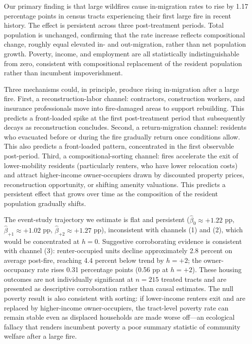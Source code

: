 \documentclass[12pt]{article}
\begin{document}
Our primary finding is that large wildfires cause in-migration rates
to rise by 1.17 percentage points in census tracts experiencing 
their first large fire in recent history. The effect is persistent across 
three post-treatment periods.
Total population is unchanged, confirming that
the rate increase reflects compositional change, roughly equal elevated
in- and out-migration, rather than net population growth.
Poverty, income, and employment are all statistically indistinguishable
from zero, consistent with compositional replacement of the resident
population rather than incumbent impoverishment.

Three mechanisms could, in principle, produce rising in-migration after
a large fire. First, a reconstruction-labor channel: contractors, construction
workers, and insurance professionals move into fire-damaged areas to
support rebuilding. This predicts a front-loaded spike at the first post-treatment period that
subsequently decays as reconstruction concludes.
Second, a return-migration channel: residents who evacuated
before or during the fire gradually return once conditions allow.
This also predicts a front-loaded pattern, concentrated in the first
observable post-period. Third, a compositional-sorting channel: fires accelerate
the exit of lower-mobility residents (particularly renters, who have lower
relocation costs) and attract higher-income owner-occupiers drawn by
discounted property prices, reconstruction opportunity, or shifting
amenity valuations. This predicts a persistent effect that grows over time as the composition
of the resident population gradually shifts.

The event-study trajectory we estimate is flat and persistent
($\hat{\beta}_0 \approx +1.22$ pp, $\hat{\beta}_{+1} \approx +1.02$ pp,
$\hat{\beta}_{+2} \approx +1.27$ pp), inconsistent with channels (1)
and (2), which would be concentrated at $h = 0$.
Suggestive corroborating evidence is consistent with channel (3):
renter-occupied units decline approximately 2.8 percent on average
post-fire, reaching 4.4 percent below trend by $h = +2$;
the owner-occupancy rate rises 0.31 percentage points
(0.56 pp at $h = +2$).
These housing outcomes are not individually significant at $n = 215$
treated tracts and are presented as descriptive corroboration rather
than causal estimates.
The null poverty result is also consistent with sorting:
if lower-income renters exit and are replaced by higher-income
owner-occupiers, the tract-level poverty rate can remain stable even
as displaced households are made worse off---an ecological fallacy
that renders incumbent poverty a poor summary statistic of community
welfare after a large fire.
\end{document}
